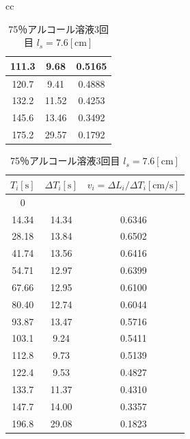 \documentclass[a4j,10pt]{jarticle}
\begin{document}
\begin{itemize}
\begin{table}[h]
\begin{tabular}{cc}
\begin{minipage}{.5\hsize}
\begin{center}
\begin{tabular}{|c|c|c|}
111.3&9.68&0.5165\\\hline
120.7&9.41&0.4888\\\hline
132.2&11.52&0.4253\\\hline
145.6&13.46&0.3492\\\hline
175.2&29.57&0.1792\\\hline
\end{tabular}
\end{center}
\end{minipage}
\end{tabular}
\begin{minipage}{.5\hsize}
\begin{center}
\caption{75％アルコール溶液3回目 $l_s=7.6[\mathrm{cm}]$}
\label{75-3}
\begin{tabular}{|c|c|c|} \hline
  $T_i[\mathrm s]$ & $\Delta T_i[\mathrm s]$ & $v_i=\Delta L_i/\Delta T_i\mathrm{[cm/s]}$ \\ \hline \hline
  0&&\\\hline
  14.34&14.34&0.6346\\\hline
28.18&13.84&0.6502\\\hline
41.74&13.56&0.6416\\\hline
54.71&12.97&0.6399\\\hline
67.66&12.95&0.6100\\\hline
80.40&12.74&0.6044\\\hline
93.87&13.47&0.5716\\\hline
103.1&9.24&0.5411\\\hline
112.8&9.73&0.5139\\\hline
122.4&9.53&0.4827\\\hline
133.7&11.37&0.4310\\\hline
147.7&14.00&0.3357\\\hline
196.8&29.08&0.1823\\\hline
\end{tabular}
\end{center}
\end{minipage}
\end{table}

\end{itemize}
\end{document}
